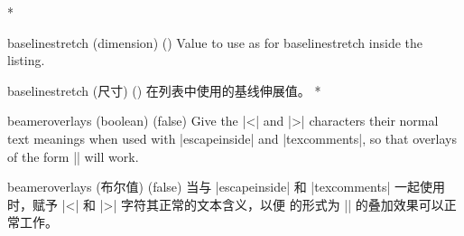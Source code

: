 \begin{paracol}{2}
\begin{optionlist}
\switchcolumn[0]*%
\item[baselinestretch (dimension) (\meta{document default})]
Value to use as for baselinestretch inside the listing.
\switchcolumn
\item[baselinestretch (尺寸) (\meta{文档默认值})]
在列表中使用的基线伸展值。
\switchcolumn[0]*%
\item[beameroverlays (boolean) (false)]
Give the |<| and |>| characters their normal text meanings when used with |escapeinside| and |texcomments|, so that  overlays of the form || will work.
\switchcolumn
\item[beameroverlays (布尔值) (false)]
当与 |escapeinside| 和 |texcomments| 一起使用时，赋予 |<| 和 |>| 字符其正常的文本含义，以便  的形式为 || 的叠加效果可以正常工作。
\end{optionlist}
\end{paracol}
